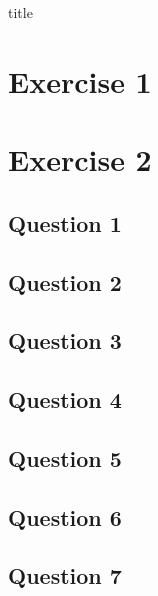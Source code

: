 \documentclass[12pt]{article}
\begin{document}
{title}

\tableofcontents




\section{Exercise 1}
\section{Exercise 2}
\subsection{Question 1}
\subsection{Question 2}
\subsection{Question 3}
\subsection{Question 4}
\subsection{Question 5}
\subsection{Question 6}
\subsection{Question 7}
\end{document}
